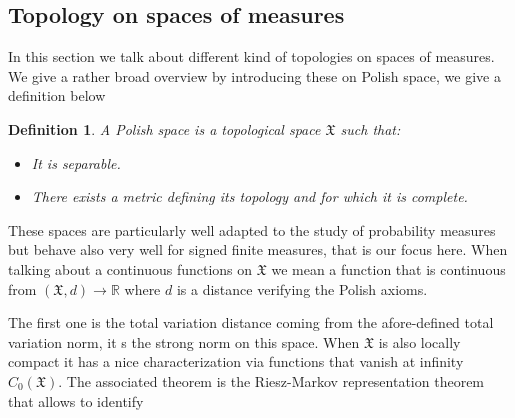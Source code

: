 \documentclass[11pt,a4paper]{article}
\newcommand{\RR}{\mathbb{R}}
\newcommand{\XF}{\mathfrak{X}}
\newtheorem{definition}[theorem]{Definition}
\begin{document}
\subsection{Topology on spaces of measures}
In this section we talk about different kind of topologies on spaces of measures. We give a rather broad overview by introducing these on Polish space, we give a definition below
\begin{definition}
    A Polish space is a topological space $\XF$ such that:
    \begin{itemize}
        \item It is separable.
        \item There exists a metric defining its topology and for which it is complete.
    \end{itemize}
\end{definition}
These spaces are particularly well adapted to the study of probability measures but behave also very well for signed finite measures, that is our focus here. When talking about a continuous functions on $\XF$ we mean a function that is continuous from $(\XF,d) \to \RR$ where $d$ is a distance verifying the Polish axioms.

The first one is the total variation distance coming from the afore-defined total variation norm, it s the strong norm on this space. When $\XF$ is also locally compact it has a nice characterization via functions that vanish at infinity $C_0(\XF)$. The associated theorem is the Riesz-Markov representation theorem that allows to identify
\end{document}
